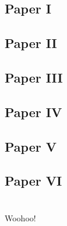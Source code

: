 \documentclass{UUThesisTemplate}
\begin{document}
%
\section*{Paper I}





%
\section*{Paper II}





%
\section*{Paper III}





%
\section*{Paper IV}





%
\section*{Paper V}





%
\section*{Paper VI}
















\chapter{{}}
{\noteunic
Woohoo!
}
\end{document}
